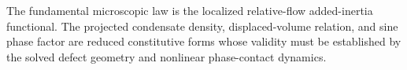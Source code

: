 The fundamental microscopic law is the localized relative-flow added-inertia functional. The projected condensate density, displaced-volume relation, and sine phase factor are reduced constitutive forms whose validity must be established by the solved defect geometry and nonlinear phase-contact dynamics.
